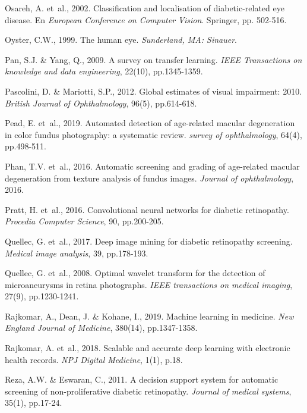 \documentclass[
  12pt,
  spanish,
  a4paperpaper,
]{report}
\begin{document}
\leavevmode\hypertarget{ref-osareh2002classification}{}%
Osareh, A. et~al., 2002. Classification and localisation of
diabetic-related eye disease. En \emph{European Conference on Computer
Vision}. Springer, pp. 502-516.

\leavevmode\hypertarget{ref-oyster1999human}{}%
Oyster, C.W., 1999. The human eye. \emph{Sunderland, MA: Sinauer}.

\leavevmode\hypertarget{ref-pan2009survey}{}%
Pan, S.J. \& Yang, Q., 2009. A survey on transfer learning. \emph{IEEE
Transactions on knowledge and data engineering}, 22(10), pp.1345-1359.

\leavevmode\hypertarget{ref-pascolini2012global}{}%
Pascolini, D. \& Mariotti, S.P., 2012. Global estimates of visual
impairment: 2010. \emph{British Journal of Ophthalmology}, 96(5),
pp.614-618.

\leavevmode\hypertarget{ref-pead2019automated}{}%
Pead, E. et~al., 2019. Automated detection of age-related macular
degeneration in color fundus photography: a systematic review.
\emph{survey of ophthalmology}, 64(4), pp.498-511.

\leavevmode\hypertarget{ref-phan2016automatic}{}%
Phan, T.V. et~al., 2016. Automatic screening and grading of age-related
macular degeneration from texture analysis of fundus images.
\emph{Journal of ophthalmology}, 2016.

\leavevmode\hypertarget{ref-pratt2016convolutional}{}%
Pratt, H. et~al., 2016. Convolutional neural networks for diabetic
retinopathy. \emph{Procedia Computer Science}, 90, pp.200-205.

\leavevmode\hypertarget{ref-quellec2017deep}{}%
Quellec, G. et~al., 2017. Deep image mining for diabetic retinopathy
screening. \emph{Medical image analysis}, 39, pp.178-193.

\leavevmode\hypertarget{ref-quellec2008optimal}{}%
Quellec, G. et~al., 2008. Optimal wavelet transform for the detection of
microaneurysms in retina photographs. \emph{IEEE transactions on medical
imaging}, 27(9), pp.1230-1241.

\leavevmode\hypertarget{ref-rajkomar2019machine}{}%
Rajkomar, A., Dean, J. \& Kohane, I., 2019. Machine learning in
medicine. \emph{New England Journal of Medicine}, 380(14), pp.1347-1358.

\leavevmode\hypertarget{ref-rajkomar2018scalable}{}%
Rajkomar, A. et~al., 2018. Scalable and accurate deep learning with
electronic health records. \emph{NPJ Digital Medicine}, 1(1), p.18.

\leavevmode\hypertarget{ref-reza2011decision}{}%
Reza, A.W. \& Eswaran, C., 2011. A decision support system for automatic
screening of non-proliferative diabetic retinopathy. \emph{Journal of
medical systems}, 35(1), pp.17-24.
\end{document}
